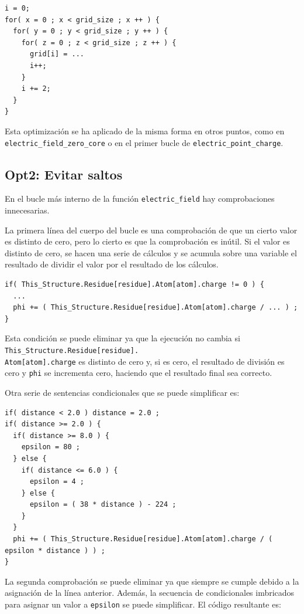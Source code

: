 \begin{lstlisting}[]
i = 0;
for( x = 0 ; x < grid_size ; x ++ ) {
  for( y = 0 ; y < grid_size ; y ++ ) {
    for( z = 0 ; z < grid_size ; z ++ ) {
      grid[i] = ...
      i++;
    }
    i += 2;
  }
}
\end{lstlisting}

Esta optimizaci\'{o}n se ha aplicado de la misma forma en otros puntos, como en
\texttt{electric\_field\_zero\_core} o en el primer bucle de
\texttt{electric\_point\_charge}.

\subsection{Opt2: Evitar saltos}

En el bucle m\'{a}s interno de la funci\'{o}n \texttt{electric\_field} hay
comprobaciones innecesarias.

La primera l\'{i}nea del cuerpo del bucle es una comprobaci\'{o}n de que un
cierto valor es distinto de cero, pero lo cierto es que la comprobaci\'{o}n es
in\'{u}til. Si el valor es distinto de cero, se hacen una serie de c\'{a}lculos
y se acumula sobre una variable el resultado de dividir el valor por el
resultado de los c\'{a}lculos.

\begin{lstlisting}[]
if( This_Structure.Residue[residue].Atom[atom].charge != 0 ) {
  ...
  phi += ( This_Structure.Residue[residue].Atom[atom].charge / ... ) ;
}
\end{lstlisting}

Esta condici\'{o}n se puede eliminar ya que la ejecuci\'{o}n no cambia si
\texttt{This\_Structure.Residue[residue].\\Atom[atom].charge} es
distinto de cero y, si es cero, el resultado de divisi\'{o}n es cero y
\texttt{phi} se incrementa cero, haciendo que el resultado final sea correcto.

Otra serie de sentencias condicionales que se puede simplificar es:

\begin{lstlisting}[]
if( distance < 2.0 ) distance = 2.0 ;
if( distance >= 2.0 ) {
  if( distance >= 8.0 ) {
    epsilon = 80 ;
  } else {
    if( distance <= 6.0 ) {
      epsilon = 4 ;
    } else {
      epsilon = ( 38 * distance ) - 224 ;
    }
  }
  phi += ( This_Structure.Residue[residue].Atom[atom].charge / ( epsilon * distance ) ) ;
}
\end{lstlisting}

La segunda comprobaci\'{o}n se puede eliminar ya que siempre se cumple debido a
la asignaci\'{o}n de la l\'{i}nea anterior. Adem\'{a}s, la secuencia de
condicionales imbricados para asignar un valor a \texttt{epsilon} se puede
simplificar. El c\'{o}digo resultante es:

